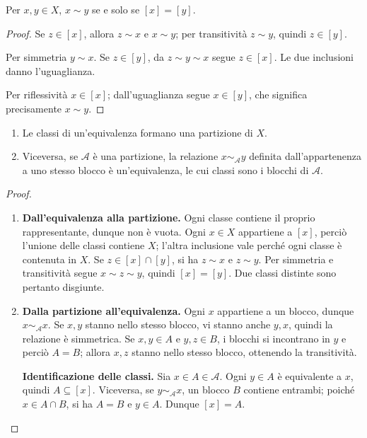 \begin{proposizione}\label{prop:classi}
Per $x,y\in X$, $x\sim y$ se e solo se $[x]=[y]$.
\end{proposizione}
\begin{proof}
 Se $z\in[x]$, allora $z\sim x$ e $x\sim y$; per transitività $z\sim y$, quindi $z\in[y]$.

 Per simmetria $y\sim x$. Se $z\in[y]$, da $z\sim y\sim x$ segue $z\in[x]$. Le due inclusioni danno l'uguaglianza.

 Per riflessività $x\in[x]$; dall'uguaglianza segue $x\in[y]$, che significa precisamente $x\sim y$.
\end{proof}

\begin{teorema}\label{teo:partizioni}
\begin{enumerate}[label=\arabic*.]
\item Le classi di un'equivalenza formano una partizione di $X$.
\item Viceversa, se $\mathcal A$ è una partizione, la relazione $x\sim_{\mathcal A}y$ definita dall'appartenenza a uno stesso blocco è un'equivalenza, le cui classi sono i blocchi di $\mathcal A$.
\end{enumerate}
\end{teorema}
\begin{proof}
\begin{enumerate}[label=\arabic*.]
\item \textbf{Dall'equivalenza alla partizione.} Ogni classe contiene il proprio rappresentante, dunque non è vuota. Ogni $x\in X$ appartiene a $[x]$, perciò l'unione delle classi contiene $X$; l'altra inclusione vale perché ogni classe è contenuta in $X$. Se $z\in[x]\cap[y]$, si ha $z\sim x$ e $z\sim y$. Per simmetria e transitività segue $x\sim z\sim y$, quindi $[x]=[y]$. Due classi distinte sono pertanto disgiunte.
\item \textbf{Dalla partizione all'equivalenza.} Ogni $x$ appartiene a un blocco, dunque $x\sim_{\mathcal A}x$. Se $x,y$ stanno nello stesso blocco, vi stanno anche $y,x$, quindi la relazione è simmetrica. Se $x,y\in A$ e $y,z\in B$, i blocchi si incontrano in $y$ e perciò $A=B$; allora $x,z$ stanno nello stesso blocco, ottenendo la transitività.

\textbf{Identificazione delle classi.} Sia $x\in A\in\mathcal A$. Ogni $y\in A$ è equivalente a $x$, quindi $A\subseteq[x]$. Viceversa, se $y\sim_{\mathcal A}x$, un blocco $B$ contiene entrambi; poiché $x\in A\cap B$, si ha $A=B$ e $y\in A$. Dunque $[x]=A$.
\end{enumerate}
\end{proof}


